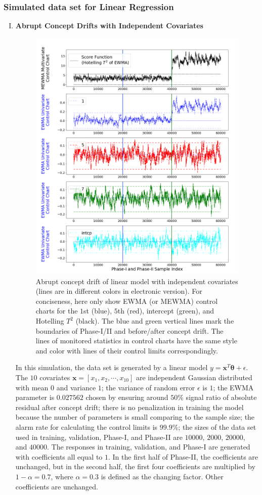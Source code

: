 \documentclass[twoside,11pt]{article}
\begin{document}
\subsubsection{Simulated data set for Linear Regression}
\begin{enumerate}[(I)]
\item
\textbf{Abrupt Concept Drifts with Independent Covariates}

\label{sss:lin_ind_pred}
\begin{figure}[!hpt]
\centering
  \includegraphics[width = 0.6\linewidth]{../figures/v14/sim_2/reg/neg_single_1_sim2_mlines_with_regu_1e-08_0_005.png}
  \caption{Abrupt concept drift of linear model with independent covariates (lines are in different colors in electronic version). For conciseness, here only show EWMA (or MEWMA) control charts for the $1$st (blue), $5$th (red), intercept (green), and Hotelling $T^2$ (black). The blue and green vertical lines mark the boundaries of Phase-I/II and before/after concept drift. The lines of monitored statistics in control charts have the same style and color with lines of their control limits correspondingly.}
  \label{fig:lin_reg_ind_X}
\end{figure}
In this simulation, the data set is generated by a {linear} model $y = \bm {x}^T\bm { \theta} + \epsilon$. The $10$ {covariates} {$\bm {x}=[x_1, x_2, \cdots, x _{10}]$} are independent Gaussian distributed with mean $0$ and variance $1$; the variance of random error $ \epsilon$ is $1$; the EWMA parameter is $0.027562$ chosen by ensuring around $50\%$ signal ratio of absolute residual after concept drift; there is no penalization in training the model because the number of parameters is small comparing to the sample size; the alarm rate for calculating the control limits is $99.9\%$; the sizes of the data set used in training, validation, Phase-I, and Phase-II are $10000$, $2000$, $20000$, and $40000$. The responses in training, validation, and Phase-I are generated with coefficients all equal to $1$. In the first half of Phase-II, the coefficients are unchanged, but in the second half, the first four coefficients are multiplied by $1- \alpha=0.7$, where $ \alpha=0.3$ is defined as the changing factor. Other coefficients are unchanged.

\end{enumerate}
\end{document}
